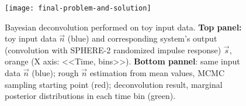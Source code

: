 \begin{figure}
	\centering
	\texttt{[image: final-problem-and-solution]}
	\caption{Bayesian deconvolution performed on toy input data. \textbf{Top panel:} toy input data $\vec{n}$ (blue) and corresponding system's output (convolution with SPHERE-2 randomized impulse response) $\vec{s}$, orange (X axis: <<Time, bins>>). \textbf{Bottom pannel}: same input data $\vec{n}$ (blue); rough $\vec{n}$ estimation from mean values, MCMC sampling starting point (red); deconvolution result, marginal posterior distributions in each time bin (green).}
	\label{pic:bayesian-deconvolution-with-experimantal-rir-and-rounding}
\end{figure}

